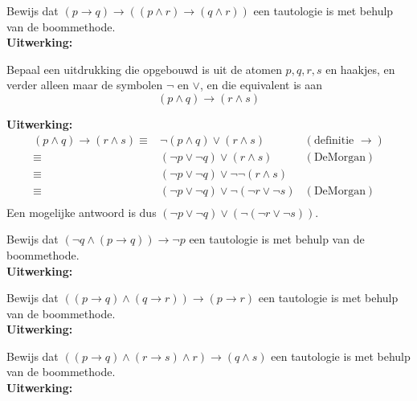 \begin{answer}
Bewijs dat $(p\rightarrow q)\rightarrow((p\land r)\rightarrow (q\land r))$ een tautologie is met behulp van de boommethode.\\[2.5pt]

\noindent\textbf{Uitwerking:}
\end{answer}

\begin{answer}
Bepaal een uitdrukking die opgebouwd is uit de atomen $p,q,r,s$ en haakjes, en verder alleen maar de symbolen $\neg$ en $\lor$, en die equivalent is aan
    $$(p\land q)\rightarrow(r\land s)$$
    
\noindent\textbf{Uitwerking:}
$$\begin{array}{rll}
     (p\land q)\rightarrow (r\land s)\equiv&\neg(p\land q)\lor(r\land s)&(\text{definitie }\rightarrow)\\
     \equiv&(\neg p\lor\neg q)\lor(r\land s)&(\text{DeMorgan})\\
     \equiv&(\neg p\lor\neg q)\lor\neg\neg(r\land s)&\\
     \equiv&(\neg p\lor\neg q)\lor\neg(\neg r\lor\neg s)&(\text{DeMorgan})\\
\end{array}$$
Een mogelijke antwoord is dus $(\neg p\lor\neg q)\lor(\neg(\neg r\lor \neg s))$.
\end{answer}

\begin{answer}
Bewijs dat $(\neg q\land(p\rightarrow q))\rightarrow\neg p$ een tautologie is met behulp van de boommethode.\\[2.5pt]

\noindent\textbf{Uitwerking:}
\end{answer}

\begin{answer}
Bewijs dat $((p\rightarrow q)\land(q\rightarrow r))\rightarrow (p\rightarrow r)$ een tautologie is met behulp van de boommethode.\\[2.5pt]

\noindent\textbf{Uitwerking:}
\end{answer}

\begin{answer}
Bewijs dat $((p\rightarrow q)\wedge(r\rightarrow s) \wedge r)\rightarrow (q\wedge s)$ een tautologie is met behulp van de boommethode.\\[2.5pt]

\noindent\textbf{Uitwerking:}
\end{answer}

